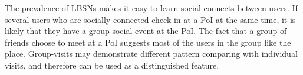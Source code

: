  The prevalence of LBSNs makes it easy to learn social connects between users. If several users who are socially connected check in at a PoI at the same time, it is likely that they have a group social event at the PoI. The fact that a group of friends choose to meet at a PoI suggests most of the users in the group like the place. Group-visits may demonstrate different pattern comparing with individual visits, and therefore can be used as a distinguished feature. 

